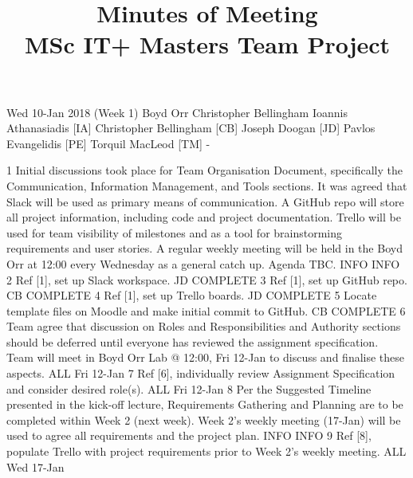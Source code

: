 \documentclass[a4paper, 12pt]{article}
\title{Minutes of Meeting \\ MSc IT+ Masters Team Project}
\date{}
\begin{document}
	\maketitle
	\momtoptable
	{Wed 10-Jan 2018 (Week 1)}
	{Boyd Orr}
	{Christopher Bellingham}
	{Ioannis Athanasiadis [IA]\newline
	Christopher Bellingham [CB]\newline
	Joseph Doogan [JD]\newline
	Pavlos Evangelidis [PE]\newline
	Torquil MacLeod [TM]}
	{-}

	\begin{momitems}
		\momitem
		{1}
		{Initial discussions took place for Team Organisation Document, specifically the Communication, Information Management, and Tools sections. It was agreed that Slack will be used as primary means of communication. A GitHub repo will store all project information, including code and project documentation. Trello will be used for team visibility of milestones and as a tool for brainstorming requirements and user stories. A regular weekly meeting will be held in the Boyd Orr at 12:00 every Wednesday as a general catch up. Agenda TBC.}
		{INFO}
		{INFO}
		\momitem
		{2}
		{Ref [1], set up Slack workspace.}
		{JD}
		{COMPLETE}
		\momitem
		{3}
		{Ref [1], set up GitHub repo.}
		{CB}
		{COMPLETE}
		\momitem
		{4}
		{Ref [1], set up Trello boards.}
		{JD}
		{COMPLETE}
		\momitem
		{5}
		{Locate template files on Moodle and make initial commit to GitHub.}
		{CB}
		{COMPLETE}
		\momitem
		{6}
		{Team agree that discussion on Roles and Responsibilities and Authority sections should be deferred until everyone has reviewed the assignment specification. Team will meet in Boyd Orr Lab @ 12:00, Fri 12-Jan to discuss and finalise these aspects.}
		{ALL}
		{Fri 12-Jan}
		\momitem
		{7}
		{Ref [6], individually review Assignment Specification and consider desired role(s).}
		{ALL}
		{Fri 12-Jan}
		\momitem
		{8}
		{Per the Suggested Timeline presented in the kick-off lecture, Requirements Gathering and Planning are to be completed within Week 2 (next week). Week 2's weekly meeting (17-Jan) will be used to agree all requirements and the project plan.}
		{INFO}
		{INFO}
		\momitem
		{9}
		{Ref [8], populate Trello with project requirements prior to Week 2's weekly meeting.}
		{ALL}
		{Wed 17-Jan}
	\end{momitems}
\end{document}
